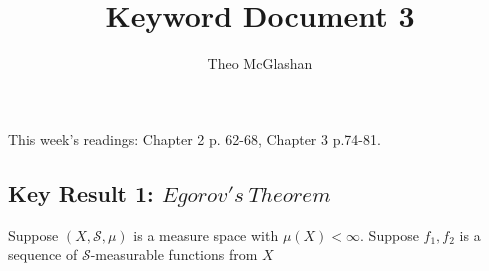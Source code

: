 \documentclass[12pt]{article}
\title{Keyword Document 3}
\author{Theo McGlashan}
\date{}
\begin{document}
This week's readings: Chapter 2 p. 62-68, Chapter 3 p.74-81.

\subsection*{Key Result 1: $Egorov's~Theorem$}

Suppose $(X, \mathcal{S}, \mu)$ is a measure space with $\mu(X) < \infty$. Suppose $f_1, f_2$ is a sequence of $\mathcal{S}$-measurable functions from $X$
\maketitle
\end{document}
